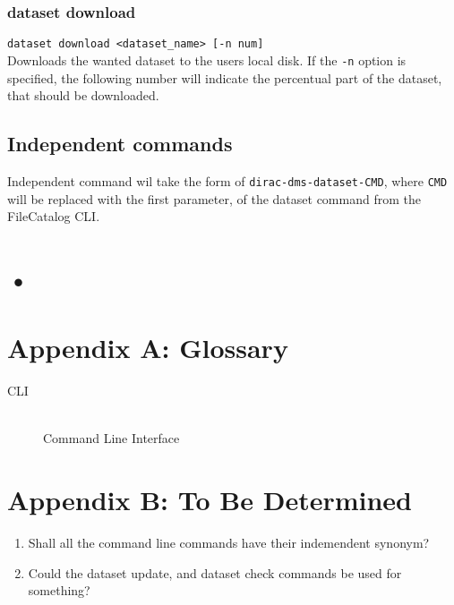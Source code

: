 \documentclass{scrreprt}
\begin{document}
\subsection{dataset download}
\texttt{dataset download <dataset_name> [-n num]} \\
Downloads the wanted dataset to the users local disk. If the \texttt{-n} option is specified, the following number will indicate the percentual part of the dataset, that should be downloaded.


\section{Independent commands}
Independent command wil take the form of \texttt{dirac-dms-dataset-CMD}, where \texttt{CMD} will be replaced with the first parameter, of the dataset command from the FileCatalog CLI. 



\chapter{•}

\newpage
\appendix
\chapter*{Appendix A: Glossary} \label{App:AppendixA}
\begin{description}
\item[CLI] \hfill \\
Command Line Interface
\end{description}

\newpage
\appendix
\chapter*{Appendix B: To Be Determined} \label{App:AppendixB}
\begin{enumerate}
\item Shall all the command line commands have their indemendent synonym?
\item Could the dataset update, and dataset check commands be used for something?

\end{enumerate}
\end{document}
